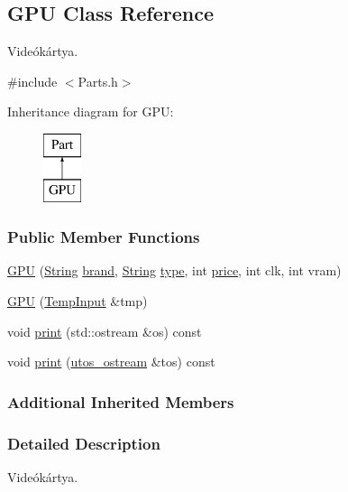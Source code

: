 \subsection{G\+PU Class Reference}
\label{class_g_p_u}


Videókártya.  




{\ttfamily \#include $<$Parts.\+h$>$}

Inheritance diagram for G\+PU\+:\begin{figure}[H]
\begin{center}
\leavevmode
\includegraphics[height=2.000000cm]{class_g_p_u}
\end{center}
\end{figure}
\subsubsection*{Public Member Functions}
\begin{DoxyCompactItemize}
\item 
\mbox{\hyperlink{class_g_p_u_a358f512b1583399e68f76248bb305e61}{G\+PU}} (\mbox{\hyperlink{class_string}{String}} \mbox{\hyperlink{class_part_ae06f2fdeb7fbbdb229a7aca151f3e341}{brand}}, \mbox{\hyperlink{class_string}{String}} \mbox{\hyperlink{class_part_a101dbcc5c4b21564df7414c7eb0eae88}{type}}, int \mbox{\hyperlink{class_part_a8e71223aed1da95a974f33d8d6c91bb1}{price}}, int clk, int vram)
\item 
\mbox{\hyperlink{class_g_p_u_a9b1632e965c26051ae583c9b5e1c2e3c}{G\+PU}} (\mbox{\hyperlink{struct_temp_input}{Temp\+Input}} \&tmp)
\item 
void \mbox{\hyperlink{class_g_p_u_abfa2a8fa30047e9759080d724e4b3820}{print}} (std\+::ostream \&os) const
\item 
void \mbox{\hyperlink{class_g_p_u_acfa9ab35cdf1c25c324fc39c6ffc2412}{print}} (\mbox{\hyperlink{structutos__ostream}{utos\+\_\+ostream}} \&tos) const
\end{DoxyCompactItemize}
\subsubsection*{Additional Inherited Members}


\subsubsection{Detailed Description}
Videókártya. 

